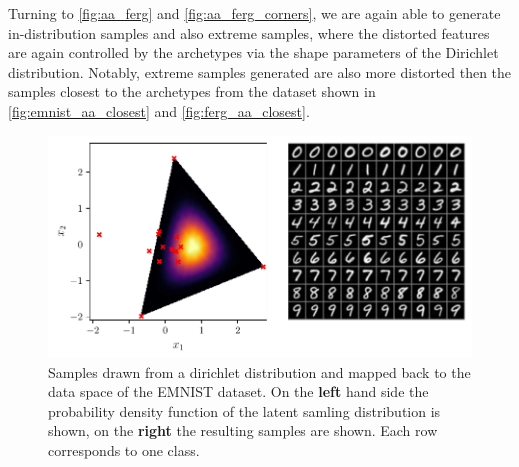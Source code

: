 Turning to \autoref{fig:aa_ferg} and \autoref{fig:aa_ferg_corners}, we
are again able to generate in-distribution samples and also extreme samples,
where the distorted features are again controlled by the archetypes via the
shape parameters of the Dirichlet distribution. Notably, extreme samples
generated are also more distorted then the samples closest to the archetypes
from the dataset shown in \autoref{fig:emnist_aa_closest} and
\autoref{fig:ferg_aa_closest}.

\begin{figure}[htpb]
	\centering
	\includegraphics[width=1\linewidth]{figures/samples/aa_emnist.pdf}
	\caption{Samples drawn from a dirichlet distribution and mapped back to
		the data space of the EMNIST dataset. On the \textbf{left} hand side the
		probability density function of the latent samling distribution is
		shown, on the \textbf{right} the resulting samples are shown. Each row
		corresponds to one class.}%
	\label{fig:aa_emnist}
\end{figure}

